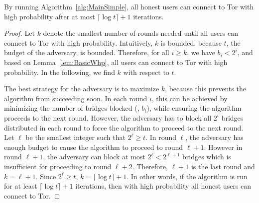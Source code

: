 \begin{lemma} \label{lem:NumIterationsBasic}
	By running Algorithm~\ref{alg:MainSimple}, all honest users can connect to Tor with high probability after at most ${\lceil \log{t} \rceil + 1}$ iterations.
\end{lemma}
\begin{proof}
	Let $k$ denote the smallest number of rounds needed until all users can connect to Tor with high probability. Intuitively, $k$ is  bounded, because $t$, the budget of the adversary, is bounded. Therefore, for all ${i \geq k}$, we have ${b_i < 2^i}$, and based on Lemma~\ref{lem:BasicWhp}, all users can connect to Tor with high probability. In the following, we find $k$ with respect to $t$. 
	
	The best strategy for the adversary is to maximize $k$, because this prevents the algorithm from succeeding soon. In each round $i$, this can be achieved by minimizing the number of bridges blocked (\ie, $b_i$), while ensuring the algorithm proceeds to the next round. However, the adversary has to block all $2^i$ bridges distributed in each round to force the algorithm to proceed to the next round. Let $\ell$ be the smallest integer such that ${2^\ell \geq t}$. In round $\ell$, the adversary has enough budget to cause the algorithm to proceed to round ${\ell + 1}$. However in round ${{\ell + 1}}$, the adversary can block at most ${2^\ell < 2^{\ell+1}}$ bridges which is insufficient for proceeding to round ${\ell + 2}$. Therefore, ${\ell + 1}$ is the last round and ${k = \ell + 1}$. Since ${2^\ell \geq t}$, ${k = \lceil \log{t} \rceil + 1}$. In other words, if the algorithm is run for at least ${\lceil \log{t} \rceil + 1}$ iterations, then with high probability all honest users can connect to Tor.
	

\end{proof}
